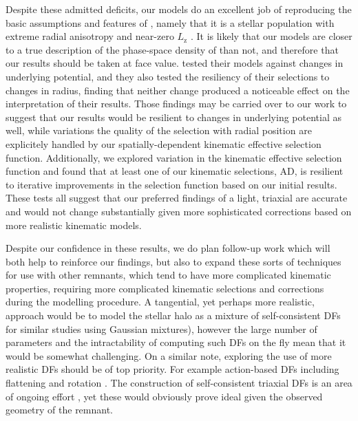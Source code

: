 Despite these admitted deficits, our models do an excellent job of reproducing the basic assumptions and features of \gse, namely that it is a stellar population with extreme radial anisotropy and near-zero $L_\mathrm{z}$ \parencite[see figure 4 in][for example]{lane22}. It is likely that our models are closer to a true description of the phase-space density of \gse than not, and therefore that our results should be taken at face value. \cite{lane22} tested their models against changes in underlying potential, and they also tested the resiliency of their selections to changes in radius, finding that neither change produced a noticeable effect on the interpretation of their results. Those findings may be carried over to our work to suggest that our results would be resilient to changes in underlying potential as well, while variations the quality of the selection with radial position are explicitely handled by our spatially-dependent kinematic effective selection function. Additionally, we explored variation in the kinematic effective selection function and found that at least one of our kinematic selections, AD, is resilient to iterative improvements in the selection function based on our initial results. These tests all suggest that our preferred findings of a light, triaxial \gse are accurate and would not change substantially given more sophisticated corrections based on more realistic kinematic models.

Despite our confidence in these results, we do plan follow-up work which will both help to reinforce our findings, but also to expand these sorts of techniques for use with other remnants, which tend to have more complicated kinematic properties, requiring more complicated kinematic selections and corrections during the modelling procedure. A tangential, yet perhaps more realistic, approach would be to model the stellar halo as a mixture of self-consistent DFs \parencite[see, e.g.][]{lancaster19,iorio21} for similar studies using Gaussian mixtures), however the large number of parameters and the intractability of computing such DFs on the fly mean that it would be somewhat challenging. On a similar note, exploring the use of more realistic DFs should be of top priority. For example action-based DFs \parencite{binney14,posti15,williams15} including flattening and rotation \parencite{binney14}. The construction of self-consistent triaxial DFs is an area of ongoing effort \parencite{sanders15,binney18}, yet these would obviously prove ideal given the observed geometry of the \gse remnant.

